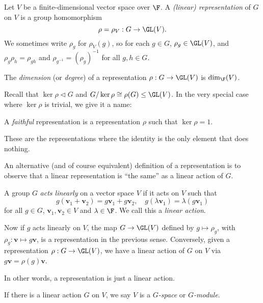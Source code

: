 \documentclass[a4paper]{article}
\begin{document}
\begin{defi}[Representation]
  Let $V$ be a finite-dimensional vector space over $\F$. A \emph{(linear) representation} of $G$ on $V$ is a group homomorphism
  \[
    \rho = \rho_V: G \to \GL(V).
  \]
  We sometimes write $\rho_g$ for $\rho_V(g)$, so for each $g \in G$, $\rho_g \in \GL(V)$, and $\rho_g \rho_h = \rho_{gh}$ and $\rho_{g^{-1}} = (\rho_g)^{-1}$ for all $g, h \in G$.
\end{defi}

\begin{defi}
  The \emph{dimension} (or \emph{degree}) of a representation $\rho: G \to \GL(V)$ is $\dim_\F(V)$.
\end{defi}

Recall that $\ker \rho \lhd G$ and $G/\ker \rho \cong \rho(G) \leq \GL(V)$. In the very special case where $\ker \rho$ is trivial, we give it a name:
\begin{defi}
  A \emph{faithful} representation is a representation $\rho$ such that $\ker \rho = 1$.
\end{defi}
These are the representations where the identity is the only element that does nothing.

An alternative (and of course equivalent) definition of a representation is to observe that a linear representation is ``the same'' as a linear action of $G$.
\begin{defi}
  A group $G$ \emph{acts linearly} on a vector space $V$ if it acts on $V$ such that
  \[
    g(\mathbf{v}_1 + \mathbf{v}_2) = g \mathbf{v}_1 + g \mathbf{v}_2,\quad g(\lambda \mathbf{v}_1) = \lambda (g\mathbf{v}_1)
  \]
  for all $g \in G$, $\mathbf{v}_1, \mathbf{v}_2 \in V$ and $\lambda \in \F$. We call this a \emph{linear action}.
\end{defi}
Now if $g$ acts linearly on $V$, the map $G \to \GL(V)$ defined by $g \mapsto \rho_g$, with $\rho_g: \mathbf{v} \mapsto g\mathbf{v}$, is a representation in the previous sense. Conversely, given a representation $\rho: G \to \GL(V)$, we have a linear action of $G$ on $V$ via $g\mathbf{v} = \rho(g) \mathbf{v}$.

In other words, a representation is just a linear action.

\begin{defi}
  If there is a linear action $G$ on $V$, we say $V$ is a \emph{$G$-space} or \emph{$G$-module}.
\end{defi}
\end{document}
